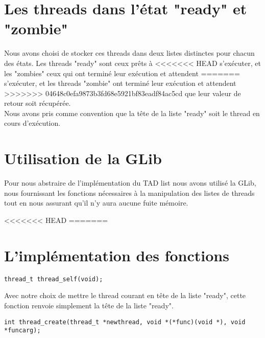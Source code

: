 \documentclass[12pt]{article}
\begin{document}
\section {Les threads dans l'état "ready" et "zombie"}

Nous avons choisi de stocker ces threads dans deux listes distinctes
pour chacun des états. Les threads "ready" sont ceux prêts à
<<<<<<< HEAD
s'exécuter, et les "zombies" ceux qui ont terminé leur exécution et attendent
=======
s'exécuter, et les threads "zombie" ont terminé leur exécution et attendent
>>>>>>> 04648c0efa9873b3fd68e5921bf83eadf84ac5cd
que leur valeur de retour soit récupérée.\\
Nous avons pris comme convention que la tête de la liste "ready" soit
le thread en cours d'exécution.

\section {Utilisation de la GLib}

Pour nous abstraire de l'implémentation du TAD list nous avons utilisé
la GLib, nous fournissant les fonctions nécessaires à la manipulation
des listes de threads tout en nous assurant qu'il n'y aura aucune
fuite mémoire.

<<<<<<< HEAD
=======
\section {L'implémentation des fonctions}

\begin{verbatim}
thread_t thread_self(void);
\end{verbatim}
Avec notre choix de mettre le thread courant en tête de la liste "ready", 
cette fonction renvoie simplement la tête de la liste "ready".
~~\\
\begin{verbatim}
int thread_create(thread_t *newthread, void *(*func)(void *), void *funcarg);
\end{verbatim}
\end{document}
